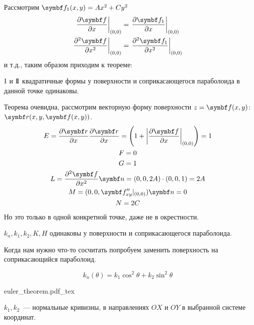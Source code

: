 \documentclass[main]{subfiles}
\begin{document}
Рассмотрим $\vf_1(x,y) = Ax^2 + Cy^2$
\begin{gather*}
    \left.\frac{\partial \vf}{\partial x} \right| _{(0,0)} = \left.\frac{\partial \vf_1}{\partial x} \right|_{(0,0)}\\
    \left.\frac{\partial^2 \vf}{\partial x^2} \right|_{(0,0)} = \left.\frac{\partial^2 \vf_1}{\partial x^2} \right|_{(0,0)}
\end{gather*}
и т.д., таким образом приходим к теореме:
\begin{theorem}
    $\mathrm{I}$ и $\mathrm{I\!I}$ квадратичные формы у поверхности и соприкасающегося параболоида в данной точке одинаковы.
\end{theorem}
Теорема очевидна, рассмотрим векторную форму поверхности $z = \vf(x,y)$: $\vr(x,y,\vf(x,y))$.
\begin{gather*}
    E = \frac{\partial \vr}{\partial x} \frac{\partial \vr}{\partial x} = \left(1 + \left|\frac{\partial \vf}{\partial x} \right|_{(0,0)}\right) = 1\\
    F = 0 \\
    G= 1\\
    L = \frac{\partial^2 \vf}{\partial x^2} \vn = (0,0,2A) \cdot (0,0,1) = 2A\\
    M = (0,0,\vf''_{xy}|_{(0,0)})\vn = 0\\
    N =  2C
\end{gather*}
Но это только в одной конкретной точке, даже не в окрестности.
\begin{corollary}
    $k_{n}, k_1, k_2, K, H$ одинаковы у поверхности и соприкасающегося параболоида.
\end{corollary}

Когда нам нужно что-то сосчитать попробуем заменить поверхность на соприкасающийся параболоид.
\begin{theorem}[Эйлера]
    \[k_{n} (\theta) = k_1 \cos^2 \theta + k_2 \sin^2 \theta\]
\end{theorem}
\begin{center}
    {euler_theorem.pdf_tex}
\end{center}
$k_1, k_2$~--- нормальные кривизны, в направлениях $OX$ и $OY$ в выбранной системе координат.
\end{document}
